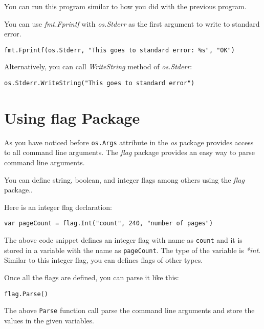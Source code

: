 

You can run this program similar to how you did with the previous program.

You can use \textit{fmt.Fprintf} with \textit{os.Stderr} as the first argument
to write to standard error.

\begin{lstlisting}[numbers=none]
fmt.Fprintf(os.Stderr, "This goes to standard error: %s", "OK")
\end{lstlisting}

Alternatively, you can call \textit{WriteString} method of \textit{os.Stderr}:

\begin{lstlisting}[numbers=none]
os.Stderr.WriteString("This goes to standard error")
\end{lstlisting}

\section{Using flag Package}

As you have noticed before \texttt{os.Args} attribute in the \textit{os} package
provides access to all command line arguments.
The \textit{flag} package provides an easy way to parse
command line arguments.

You can define string, boolean, and integer flags among others using
the \textit{flag} package..

Here is an integer flag declaration:

\begin{lstlisting}[numbers=none]
var pageCount = flag.Int("count", 240, "number of pages")
\end{lstlisting}

The above code snippet defines an integer flag with name
as \texttt{count} and it is stored in a variable with the name
as \texttt{pageCount}.  The type of the variable is \textit{*int}.
Similar to this integer flag, you can defines flags of other types.

Once all the flags are defined, you can parse it like this:

\begin{lstlisting}[numbers=none]
flag.Parse()
\end{lstlisting}

The above \texttt{Parse} function call parse the command line
arguments and store the values in the given variables.

